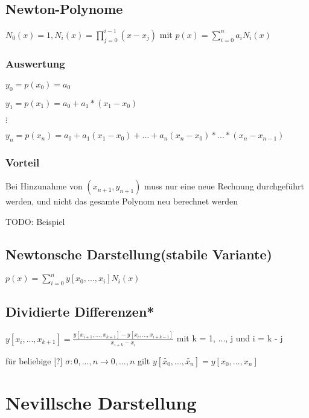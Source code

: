 \documentclass[12pt,a4paper]{article} %
\begin{document}
	\subsection{Newton-Polynome}
	
	$N_0(x) = 1, N_i(x) = \prod\limits_{j = 0}^{i - 1}(x - x_j)$ mit $p(x) = \sum\limits_{i = 0}^{n}a_iN_i(x)$
	
	\subsubsection{Auswertung}
	
	$y_0 = p(x_0) = a_0$
	
	$y_1 = p(x_1) = a_0 + a_1 * (x_1 - x_0)$
	
	$\vdots$
	
	$y_n = p(x_n) = a_0 + a_1(x_1 - x_0) + ... + a_n(x_n - x_0) * ... * (x_n - x_{n - 1})$
	
	\subsubsection{Vorteil}
	
	Bei Hinzunahme von $(x_{n + 1}, y_{n + 1})$ muss nur eine neue Rechnung durchgeführt werden, und nicht das gesamte Polynom neu berechnet werden
	
	TODO: Beispiel
	
	\subsection[Newtonsche Darstellung]{Newtonsche Darstellung(stabile Variante)}
	
	$p(x) = \sum\limits_{i = 0}^{n}y[x_0, ..., x_i] N_i(x)$
	
	\subsection{Dividierte Differenzen*}
	
	$y[x_i, ..., x_{k + 1}] = \frac{y[x_{i + 1}, ..., x_{k + 1}] - y[x_i, ..., x_{i + k - 1}]}{x_{i + k} - x_i}$ mit k = 1, ..., j und i = k - j
	
	für beliebige [?] $\sigma:{0, ..., n} \rightarrow {0, ..., n}$ gilt $y[\tilde{x_0}, ..., \tilde{x_n}] = y[x_0, ..., x_n]$
	
	\newpage
	
	\section{Nevillsche Darstellung}
	
\end{document}
